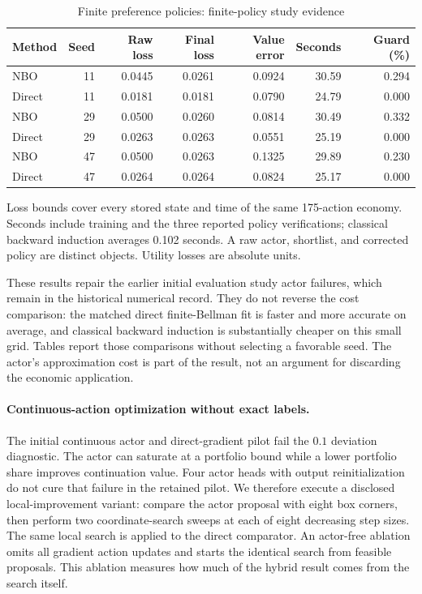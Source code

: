 \documentclass[ecta,nameyear,draft]{econsocart}
\theoremstyle{definition}
\theoremstyle{remark}
\begin{document}
\begin{table}[htbp]\centering
\caption{Finite preference policies: finite-policy study evidence}
\begin{small}\begin{tabular}{lrrrrrr}
\toprule
Method & Seed & Raw loss & Final loss & Value error & Seconds & Guard (\%) \\
\midrule
NBO & 11 & 0.0445 & 0.0261 & 0.0924 & 30.59 & 0.294 \\
Direct & 11 & 0.0181 & 0.0181 & 0.0790 & 24.79 & 0.000 \\
NBO & 29 & 0.0500 & 0.0260 & 0.0814 & 30.49 & 0.332 \\
Direct & 29 & 0.0263 & 0.0263 & 0.0551 & 25.19 & 0.000 \\
NBO & 47 & 0.0500 & 0.0263 & 0.1325 & 29.89 & 0.230 \\
Direct & 47 & 0.0264 & 0.0264 & 0.0824 & 25.17 & 0.000 \\
\bottomrule\end{tabular}\end{small}
\par\smallskip\begin{minipage}{0.96\linewidth}\footnotesize Loss bounds cover every stored state and time of the same 175-action economy. Seconds include training and the three reported policy verifications; classical backward induction averages 0.102 seconds. A raw actor, shortlist, and corrected policy are distinct objects. Utility losses are absolute units.\end{minipage}
\end{table}


These results repair the earlier initial evaluation study actor failures, which remain in the historical numerical record. They do not reverse the cost comparison: the matched direct finite-Bellman fit is faster and more accurate on average, and classical backward induction is substantially cheaper on this small grid. Tables report those comparisons without selecting a favorable seed. The actor's approximation cost is part of the result, not an argument for discarding the economic application.

\paragraph*{Continuous-action optimization without exact labels.}
The initial continuous actor and direct-gradient pilot fail the $0.1$ deviation diagnostic. The actor can saturate at a portfolio bound while a lower portfolio share improves continuation value. Four actor heads with output reinitialization do not cure that failure in the retained pilot. We therefore execute a disclosed local-improvement variant: compare the actor proposal with eight box corners, then perform two coordinate-search sweeps at each of eight decreasing step sizes. The same local search is applied to the direct comparator. An actor-free ablation omits all gradient action updates and starts the identical search from feasible proposals. This ablation measures how much of the hybrid result comes from the search itself.
\end{document}
